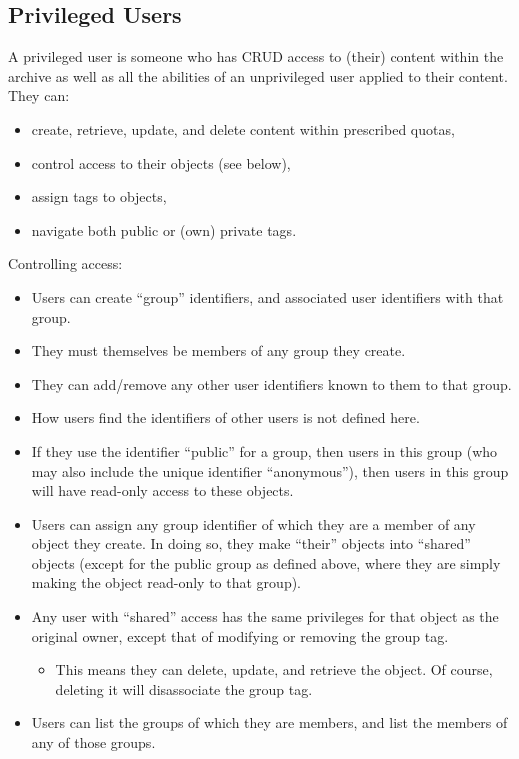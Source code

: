\subsection*{Privileged Users}

A privileged user is someone who has CRUD access to (their) content within the archive as well as all the abilities of an unprivileged user applied to their content. They can:
\begin{itemize}
	\item create, retrieve, update, and delete content within prescribed quotas,
	\item control access to their objects (see below),
	\item assign tags to objects,
	\item navigate both public or (own) private tags.
\end{itemize}

Controlling access:
\begin{itemize}
	\item Users can create ``group'' identifiers, and associated user identifiers with that group.
	\item They must themselves be members of any group they create.
	\item They can add/remove any other user identifiers known to them to that group.
	\item How users find the identifiers of other users is not defined here.
	\item If they use the identifier ``public'' for a group, then users in this group (who may also include the unique identifier ``anonymous''), then users in this group will have read-only access to these objects.
	\item Users can assign any group identifier of which they are a member of any object they create. In doing so, they make ``their'' objects into ``shared'' objects (except for the public group as defined above, where they are simply making the object read-only to that group).
	\item Any user with ``shared'' access has the same privileges for that object as the original owner, except that of modifying or removing the group tag.
	\begin{itemize}
		\item This means they can delete, update, and retrieve the object. Of course, deleting it will disassociate the group tag.
	\end{itemize}
	\item Users can list the groups of which they are members, and list the members of any of those groups.
\end{itemize}

